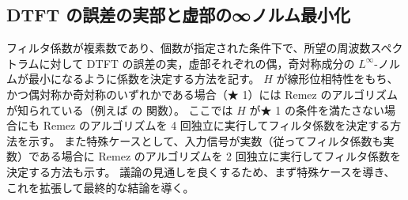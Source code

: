     \subsection{DTFT の誤差の実部と虚部の∞ノルム最小化}
        \newcommand{\Ntp}{N_{\text{tp}}}
        \newcommand{\Hid}{H_{\text{id}}}
        \newcommand{\HidR}{H_{\text{id,r}}}
        \newcommand{\HidI}{H_{\text{id,i}}}
        \newcommand{\HidH}{H_{\text{id,H}}}
        \newcommand{\HidHr}{H_{\text{id,H,r}}}
        \newcommand{\HidHi}{H_{\text{id,H,i}}}
        \newcommand{\HidSH}{H_{\text{id,SH}}}
        \newcommand{\HidSHr}{H_{\text{id,SH,r}}}
        \newcommand{\HidSHi}{H_{\text{id,SH,i}}}
        \newcommand{\hes}{h_{\text{es}}}
        \newcommand{\hos}{h_{\text{os}}}
        \newcommand{\Hes}{H_{\text{es}}}
        \newcommand{\Hos}{H_{\text{os}}}
        \newcommand{\hr}{h_{\text{r}}}
        \newcommand{\hi}{h_{\text{i}}}
        \newcommand{\hrEs}{h_{\text{r,es}}}
        \newcommand{\hrOs}{h_{\text{r,os}}}
        \newcommand{\hiEs}{h_{\text{i,es}}}
        \newcommand{\hiOs}{h_{\text{i,os}}}
        \newcommand{\hesOpt}{h_{\text{es,opt}}}
        \newcommand{\hosOpt}{h_{\text{os,opt}}}
        \newcommand{\hopt}{h_{\text{opt}}}
        \newcommand{\hrEsOpt}{h_{\text{r,es,opt}}}
        \newcommand{\hrOsOpt}{h_{\text{r,os,opt}}}
        \newcommand{\hiEsOpt}{h_{\text{i,es,opt}}}
        \newcommand{\hiOsOpt}{h_{\text{i,os,opt}}}
        \newcommand{\HesOpt}{H_{\text{es,opt}}}
        \newcommand{\HosOpt}{H_{\text{os,opt}}}
        \newcommand{\Hopt}{H_{\text{opt}}}
        \newcommand{\HrEsOpt}{H_{\text{r,es,opt}}}
        \newcommand{\HrOsOpt}{H_{\text{r,os,opt}}}
        \newcommand{\HiEsOpt}{H_{\text{i,es,opt}}}
        \newcommand{\HiOsOpt}{H_{\text{i,os,opt}}}
        \newcommand{\eEs}{\mathrm{e}_{\text{es}}}
        \newcommand{\eOs}{\mathrm{e}_{\text{os}}}
        \newcommand{\eOpt}{\mathrm{e}_{\text{opt}}}
        \newcommand{\erEs}{\mathrm{e}_{\text{r,es}}}
        \newcommand{\erOs}{\mathrm{e}_{\text{r,os}}}
        \newcommand{\eiEs}{\mathrm{e}_{\text{i,es}}}
        \newcommand{\eiOs}{\mathrm{e}_{\text{i,os}}}
        フィルタ係数が複素数であり、個数が指定された条件下で、所望の周波数スペクトラムに対して DTFT の誤差の実，虚部それぞれの偶，奇対称成分の $L^\infty$-ノルムが最小になるように係数を決定する方法を記す。
        $H$ が線形位相特性をもち、かつ偶対称か奇対称のいずれかである場合（★ 1）には Remez のアルゴリズムが知られている（例えば \cite{DSP_JL} の  関数）。
        ここでは $H$ が★ 1 の条件を満たさない場合にも Remez のアルゴリズムを 4 回独立に実行してフィルタ係数を決定する方法を示す。
        また特殊ケースとして、入力信号が実数（従ってフィルタ係数も実数）である場合に Remez のアルゴリズムを 2 回独立に実行してフィルタ係数を決定する方法も示す。
        議論の見通しを良くするため、まず特殊ケースを導き、これを拡張して最終的な結論を導く。
